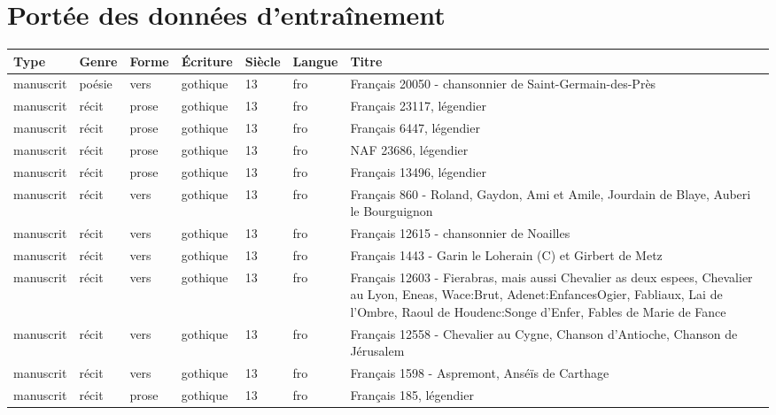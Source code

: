 \documentclass[class=article, crop=false]{standalone}
\begin{document}
\section{Portée des données d'entraînement}
\label{data:portee}
\begin{center}
\begin{tabular}[c]{| *{6}{| m{1.6cm}} | m{3cm} ||}
\hline
Type & Genre & Forme & Écriture & Siècle & Langue & Titre \\
\hline \hline
manuscrit & poésie & vers & gothique & 13 & fro & Français 20050   - chansonnier de Saint-Germain-des-Près \\
\hline
manuscrit & récit & prose & gothique & 13 & fro & Français 23117, légendier\\
\hline
manuscrit & récit & prose & gothique & 13 & fro & Français 6447, légendier\\
\hline
manuscrit & récit & prose & gothique & 13 & fro & NAF 23686, légendier\\
\hline
manuscrit & récit & prose & gothique & 13 & fro & Français 13496, légendier\\
\hline
manuscrit & récit & vers & gothique & 13 & fro & Français 860 - Roland, Gaydon, Ami et Amile, Jourdain de Blaye, Auberi le Bourguignon\\
\hline
manuscrit & récit & vers & gothique & 13 & fro & Français 12615  - chansonnier de Noailles\\
\hline
manuscrit & récit & vers & gothique & 13 & fro & Français 1443 - Garin le Loherain (C) et Girbert de Metz\\
\hline
manuscrit & récit & vers & gothique & 13 & fro & Français 12603 - Fierabras, mais aussi Chevalier as deux espees, Chevalier au Lyon, Eneas, Wace:Brut, Adenet:EnfancesOgier, Fabliaux, Lai de l'Ombre, Raoul de Houdenc:Songe d'Enfer, Fables de Marie de Fance\\
\hline
manuscrit & récit & vers & gothique & 13 & fro & Français 12558  - Chevalier au Cygne, Chanson d'Antioche, Chanson de Jérusalem\\
\hline
manuscrit & récit & vers & gothique & 13 & fro & Français 1598 - Aspremont, Anséïs de Carthage\\
\hline
manuscrit & récit & prose & gothique & 13 & fro & Français 185, légendier\\
\hline
\end{tabular}
\end{center}
\end{document}
